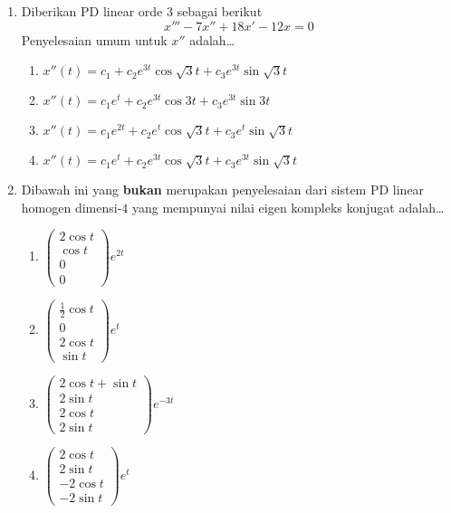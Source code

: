 \documentclass[a4paper]{article}
\theoremstyle{definisi}
\numberwithin{equation}{section}
\begin{document}
\begin{enumerate}
    \item Diberikan PD linear orde 3 sebagai berikut
    \begin{equation*}
      x'''-7x''+18x'-12x=0
    \end{equation*}
    Penyelesaian umum untuk $x''$ adalah\dots
    \begin{enumerate}[label=\Alph*.]
      \item $x''(t)=c_1+c_2e^{3t}\cos \sqrt{3}t+c_3e^{3t}\sin \sqrt{3}t$
      \item $x''(t)=c_1e^t+c_2e^{3t}\cos 3t+c_3e^{3t}\sin 3t$
      \item $x''(t)=c_1e^{2t}+c_2e^{t}\cos \sqrt{3}t+c_3e^{t}\sin \sqrt{3}t$
      \item $x''(t)=c_1e^t+c_2e^{3t}\cos \sqrt{3}t+c_3e^{3t}\sin \sqrt{3}t$
    \end{enumerate}

    \item Dibawah ini yang \textbf{bukan} merupakan penyelesaian dari sistem PD linear homogen dimensi-$4$ yang mempunyai nilai eigen kompleks konjugat adalah\dots
    \begin{enumerate}[label=\Alph*.]
      \item $\begin{pmatrix}
        2\cos t\\\cos t\\0\\0
      \end{pmatrix}e^{2t}$
      \item $\begin{pmatrix}
        \frac{1}{2}\cos t\\0\\2\cos t\\\sin t
      \end{pmatrix}e^t$
      \item $\begin{pmatrix}
        2\cos t+\sin t\\2\sin t\\2\cos t\\2\sin t
      \end{pmatrix}e^{-3t}$
      \item $\begin{pmatrix}
        2\cos t\\2\sin t\\-2\cos t\\-2\sin t
      \end{pmatrix}e^t$
    \end{enumerate}
    

\end{enumerate}
\end{document}
